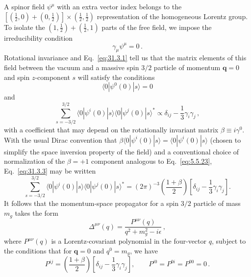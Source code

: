 A spinor field \(\psi^\mu\) with an extra vector index belongs to the
\([(\frac12,0)+(0,\frac12)]\mathbin{\times}(\frac12,\frac12)\)
representation of the homogeneous Lorentz group. To isolate the
\((1,\frac12)+(\frac12,1)\) parts of the free field, we impose the
irreducibility condition
\begin{equation}
  \gamma_\mu\psi^\mu=0\,.
  \tag{31.3.1}\label{eq:31.3.1}
\end{equation}
Rotational invariance and Eq.~\eqref{eq:31.3.1} tell us that the matrix
elements of this field between the vacuum and a massive spin \(3/2\)
particle of momentum \(\boldsymbol q=0\) and spin \(z\)-component \(s\)
will satisfy the conditions
\begin{equation}
  \langle0|\psi^0(0)|s\rangle=0
  \tag{31.3.2}\label{eq:31.3.2}
\end{equation}
and
\begin{equation}
  \sum_{s=-3/2}^{3/2}
  \langle0|\psi^i(0)|s\rangle
  \langle0|\psi^j(0)|s\rangle^*
  \propto\delta_{ij}-\frac13\gamma_i\gamma_j\,,
  \tag{31.3.3}\label{eq:31.3.3}
\end{equation}
with a coefficient that may depend on the rotationally invariant matrix
\(\beta\equiv i\gamma^0\). With the usual Dirac convention that
\(\beta\langle0|\psi^i(0)|s\rangle=\langle0|\psi^i(0)|s\rangle\)
(chosen to simplify the space inversion property of the field) and a
conventional choice of normalization of the \(\beta=+1\) component
analogous to Eq.~\eqref{eq:5.5.23}, Eq.~\eqref{eq:31.3.3} may be written
\begin{equation}
  \sum_{s=-3/2}^{3/2}
  \langle0|\psi^i(0)|s\rangle
  \langle0|\psi^j(0)|s\rangle^*
  =(2\pi)^{-3}\left(\frac{1+\beta}{2}\right)
  \left[\delta_{ij}-\frac13\gamma_i\gamma_j\right].
  \tag{31.3.4}\label{eq:31.3.4}
\end{equation}
It follows that the momentum-space propagator for a spin \(3/2\) particle
of mass \(m_g\) takes the form
\begin{equation}
  \Delta^{\mu\nu}(q)
  =\frac{P^{\mu\nu}(q)}{q^2+m_g^2-i\epsilon}\,,
  \tag{31.3.5}\label{eq:31.3.5}
\end{equation}
where \(P^{\mu\nu}(q)\) is a Lorentz-covariant polynomial in the four-vector
\(q\), subject to the conditions that for \(\boldsymbol q=0\) and
\(q^0=m_g\), we have
\begin{equation}
  P^{ij}
  =\left(\frac{1+\beta}{2}\right)
   \left[\delta_{ij}-\frac13\gamma_i\gamma_j\right],
  \qquad
  P^{i0}=P^{0i}=P^{00}=0\,.
  \tag{31.3.6}\label{eq:31.3.6}
\end{equation}

